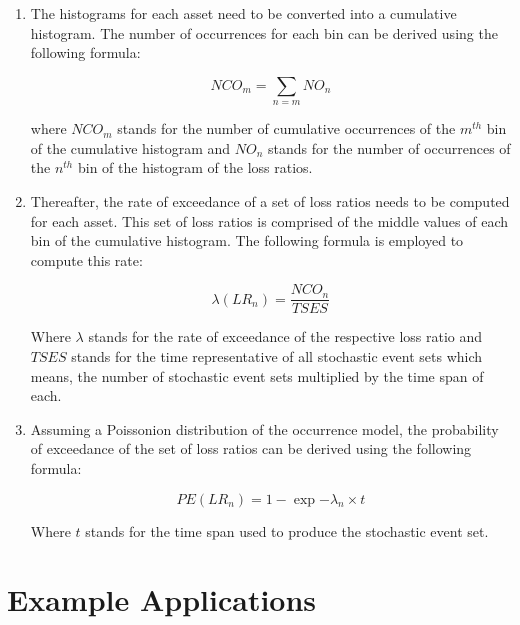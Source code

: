 \begin{enumerate}
\item The histograms for each asset need to be converted into a cumulative histogram. The number of occurrences for each bin can be derived using the following formula:

\begin{equation}
NCO_m = \sum_{n=m} NO_n
\end{equation}

where $NCO_m$ stands for the number of cumulative occurrences of the $m^{th}$ bin of the cumulative histogram and $NO_n$ stands for the number of occurrences of the $n^{th}$ bin of the histogram of the loss ratios.

\item Thereafter, the rate of exceedance of a set of loss ratios needs to be computed for each asset. This set of loss ratios is comprised of the middle values of each bin of the cumulative histogram. The following formula is employed to compute this rate:

\begin{equation}
\lambda(LR_n) = \frac{NCO_n}{TSES}
\end{equation}

Where $\lambda$ stands for the rate of exceedance of the respective loss ratio and $TSES$ stands for the time representative of all stochastic event sets which means, the number of stochastic event sets multiplied by the time span of each.

\item Assuming a Poissonion distribution of the occurrence model, the probability of exceedance of the set of loss ratios can be derived using the following formula:

\begin{equation}
PE(LR_n) = 1-\exp{-\lambda_n\times t}
\end{equation}

Where $t$ stands for the time span used to produce the stochastic event set.

\end{enumerate}

\section{Example Applications}

